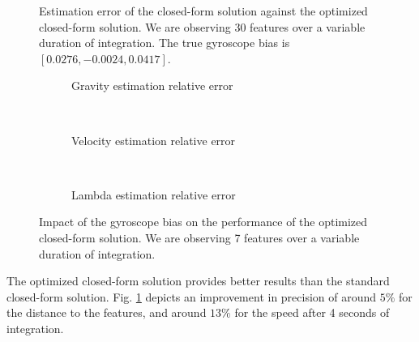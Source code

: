 \documentclass[letterpaper, 10 pt, conference]{ieeeconf}  %
\begin{document}
\begin{figure}[h!]
   \centering
   \resizebox{0.7\columnwidth}{!}{}
                \caption{Estimation error of the closed-form solution against the optimized closed-form solution.  We are observing 30 features  over a variable duration of integration. The true gyroscope bias is $[0.0276,   -0.0024,    0.0417]$. \label{fig:optEstimate}}
\end{figure}

\begin{figure}[h!]
        \centering

        \begin{subfigure}[b]{0.5\columnwidth}
                \resizebox{\columnwidth}{!}{}
                \caption{Gravity estimation relative error}

        \end{subfigure}%
        ~ %
        \begin{subfigure}[b]{0.5\columnwidth}
                \resizebox{\columnwidth}{!}{}
                \caption{Velocity estimation relative error}

        \end{subfigure}
        ~ %
        \begin{subfigure}[b]{0.5\columnwidth}
                \resizebox{\columnwidth}{!}{}
                \caption{Lambda estimation relative error}

        \end{subfigure}
        \caption{Impact of the gyroscope bias on the performance of the optimized closed-form solution. We are observing 7 features  over a variable duration of integration. \label{fig:biasGyroOpt}}
\end{figure}


The optimized closed-form solution provides better results than the standard closed-form solution. Fig. \ref{fig:optEstimate} depicts an improvement in precision of around $5\%$ for the distance to the features, and around $13\%$ for the speed after 4 seconds of integration.
\end{document}
